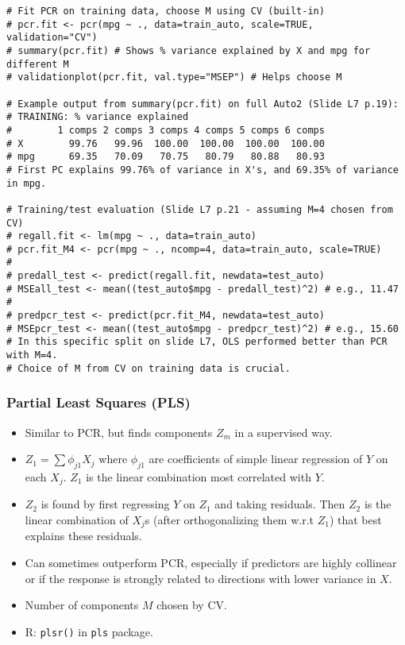 \documentclass[12pt,a4paper]{article}
\newcommand{\Rpackage}[1]{\texttt{#1}} %
\newcommand{\Rfunction}[1]{\texttt{#1()}} %
\begin{document}
\begin{itemize}
\begin{itemize}
\begin{lstlisting}[caption={PCR Example (Auto Data, Slides L7 p.19, 21)}]
# Fit PCR on training data, choose M using CV (built-in)
# pcr.fit <- pcr(mpg ~ ., data=train_auto, scale=TRUE, validation="CV")
# summary(pcr.fit) # Shows % variance explained by X and mpg for different M
# validationplot(pcr.fit, val.type="MSEP") # Helps choose M

# Example output from summary(pcr.fit) on full Auto2 (Slide L7 p.19):
# TRAINING: % variance explained
#        1 comps 2 comps 3 comps 4 comps 5 comps 6 comps
# X        99.76   99.96  100.00  100.00  100.00  100.00
# mpg      69.35   70.09   70.75   80.79   80.88   80.93
# First PC explains 99.76% of variance in X's, and 69.35% of variance in mpg.

# Training/test evaluation (Slide L7 p.21 - assuming M=4 chosen from CV)
# regall.fit <- lm(mpg ~ ., data=train_auto)
# pcr.fit_M4 <- pcr(mpg ~ ., ncomp=4, data=train_auto, scale=TRUE)
#
# predall_test <- predict(regall.fit, newdata=test_auto)
# MSEall_test <- mean((test_auto$mpg - predall_test)^2) # e.g., 11.47
#
# predpcr_test <- predict(pcr.fit_M4, newdata=test_auto)
# MSEpcr_test <- mean((test_auto$mpg - predpcr_test)^2) # e.g., 15.60
# In this specific split on slide L7, OLS performed better than PCR with M=4.
# Choice of M from CV on training data is crucial.
\end{lstlisting}
        \end{itemize}
    \subsubsection{Partial Least Squares (PLS) }
        \begin{itemize}
            \item Similar to PCR, but finds components $Z_m$ in a supervised way.
            \item $Z_1 = \sum \phi_{j1} X_j$ where $\phi_{j1}$ are coefficients of simple linear regression of $Y$ on each $X_j$. $Z_1$ is the linear combination most correlated with $Y$.
            \item $Z_2$ is found by first regressing $Y$ on $Z_1$ and taking residuals. Then $Z_2$ is the linear combination of $X_j$s (after orthogonalizing them w.r.t $Z_1$) that best explains these residuals.
            \item Can sometimes outperform PCR, especially if predictors are highly collinear or if the response is strongly related to directions with lower variance in $X$.
            \item Number of components $M$ chosen by CV.
            \item R: \Rfunction{plsr} in \Rpackage{pls} package.
        \end{itemize}


\end{itemize}
\end{document}
